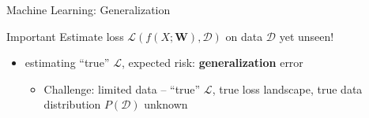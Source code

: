 \begin{frame}{Machine Learning: Generalization}
\protect\hypertarget{machine-learning-generalization}{}
\begin{block}{Important}
\protect\hypertarget{important}{}
Estimate loss \(\mathcal{L}(f(X;\mathbf{W}),\mathcal{D})\) on data
\(\mathcal{D}\) yet unseen!
\end{block}

\begin{itemize}
\tightlist
\item
  estimating ``true'' \(\mathcal{L}\), expected risk:
  \textbf{generalization} error

  \begin{itemize}
  \tightlist
  \item
    Challenge: limited data -- ``true'' \(\mathcal{L}\), true loss
    landscape, true data distribution \(P(\mathcal{D})\) unknown
  \end{itemize}
\end{itemize}


\end{frame}

